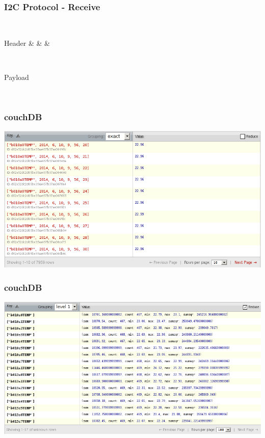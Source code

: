 \documentclass[t]{beamer}
\begin{document}
\begin{frame}[c,fragile]
    \frametitle{I2C Protocol - Receive}
  \begin{center}
		\begin{bytefield}[endianness=big, bitwidth=2.1em]{8}
		\\
		\begin{rightwordgroup}{Header}
			 &  &  & 
		\end{rightwordgroup}\\
		\begin{rightwordgroup}{Payload}
			\\
		\end{rightwordgroup}\\
	\end{bytefield}
  \end{center}
\end{frame}
\begin{frame}[c]
    \frametitle{couchDB}
  \begin{center}
  	\includegraphics[width=0.9\linewidth]{img/db1.png}\\
  \vspace{0.5cm}
  \end{center}
    
\end{frame}
\begin{frame}[c]
    \frametitle{couchDB}
  \begin{center}
  	\includegraphics[width=0.9\linewidth]{img/db2.png}\\
  \vspace{0.5cm}
  \end{center}
\end{frame}
\end{document}
